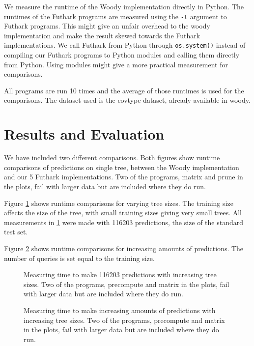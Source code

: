 \documentclass[a4paper]{article}
\begin{document}
We measure the runtime of the Woody implementation directly in Python. The runtimes of the Futhark programs are measured using the \verb!-t! argument to Futhark programs. This might give an unfair overhead to the woody implementation and make the result skewed towards the Futhark implementations. We call Futhark from Python through \verb!os.system()! instead of compiling our Futhark programs to Python modules and calling them directly from Python. Using modules might give a more practical measurement for comparisons.

All programs are run 10 times and the average of those runtimes is used for the comparisons. The dataset used is the covtype dataset, already available in woody.

\newpage
\section{Results and Evaluation}
We have included two different comparisons. Both figures show runtime comparisons of predictions on single tree, between the Woody implementation and our 5 Futhark implementations. Two of the programs, matrix and prune in the plots, fail with larger data but are included where they do run.

Figure \ref{plot:runtime1} shows runtime comparisons for varying tree sizes. The training size affects the size of the tree, with small training sizes giving very small trees. All measurements in \ref{plot:runtime1} were made with 116203 predictions, the size of the standard test set.


Figure \ref{plot:runtime2} shows runtime comparisons for increasing amounts of predictions. The number of queries is set equal to the training size.


\begin{figure}[h]
  \centering
  
  \caption{Measuring time to make 116203 predictions with increasing tree sizes. Two of the programs, precompute and matrix in the plots, fail with larger data but are included where they do run.}
  \label{plot:runtime1}
\end{figure}

\begin{figure}[h]
  \centering
  
  \caption{Measuring time to make increasing amounts of predictions with increasing tree sizes. Two of the programs, precompute and matrix in the plots, fail with larger data but are included where they do run.}
  \label{plot:runtime2}
\end{figure}
\end{document}
